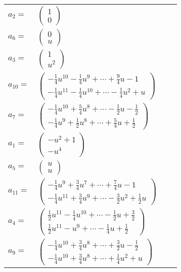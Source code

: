 \documentclass[1p]{elsarticle_modified}
\theoremstyle{definition}
\begin{document}
\begin{tabular}{m{7pt} m{180pt} m{7pt} m{180pt} }
\flushright $a_{2}=$&$\begin{pmatrix}1\\0\end{pmatrix}$ \\
\flushright $a_{6}=$&$\begin{pmatrix}0\\u\end{pmatrix}$ \\
\flushright $a_{3}=$&$\begin{pmatrix}1\\u^2\end{pmatrix}$ \\
\flushright $a_{10}=$&$\begin{pmatrix}-\frac{1}{4} u^{10}-\frac{1}{4} u^9+\cdots+\frac{9}{4} u-1\\-\frac{1}{4} u^{11}-\frac{1}{4} u^{10}+\cdots-\frac{1}{4} u^2+u\end{pmatrix}$ \\
\flushright $a_{7}=$&$\begin{pmatrix}-\frac{1}{4} u^{10}+\frac{5}{4} u^8+\cdots-\frac{1}{2} u-\frac{1}{2}\\-\frac{1}{4} u^9+\frac{1}{2} u^8+\cdots+\frac{5}{4} u+\frac{1}{2}\end{pmatrix}$ \\
\flushright $a_{1}=$&$\begin{pmatrix}- u^2+1\\- u^4\end{pmatrix}$ \\
\flushright $a_{5}=$&$\begin{pmatrix}u\\u\end{pmatrix}$ \\
\flushright $a_{11}=$&$\begin{pmatrix}-\frac{1}{4} u^9+\frac{3}{4} u^7+\cdots+\frac{7}{4} u-1\\-\frac{1}{4} u^{11}+\frac{3}{4} u^9+\cdots-\frac{3}{2} u^2+\frac{1}{2} u\end{pmatrix}$ \\
\flushright $a_{4}=$&$\begin{pmatrix}\frac{1}{2} u^{11}-\frac{1}{4} u^{10}+\cdots-\frac{1}{2} u+\frac{3}{2}\\\frac{1}{2} u^{11}- u^9+\cdots-\frac{1}{4} u+\frac{1}{2}\end{pmatrix}$ \\
\flushright $a_{9}=$&$\begin{pmatrix}-\frac{1}{4} u^{10}+\frac{3}{4} u^8+\cdots+\frac{3}{2} u-\frac{1}{2}\\-\frac{1}{4} u^{10}+\frac{3}{4} u^8+\cdots+\frac{1}{4} u^2+u\end{pmatrix}$ \\

\end{tabular}
\end{document}
